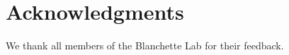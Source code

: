 \documentclass[unnumsec,webpdf,contemporary,large]{oup-authoring-template}%
\theoremstyle{thmstyleone}%
\theoremstyle{thmstyletwo}%
\theoremstyle{thmstylethree}%
\begin{document}
\section{Acknowledgments}
We thank all members of the Blanchette Lab for their feedback.








% 
% 




% 




\end{document}
